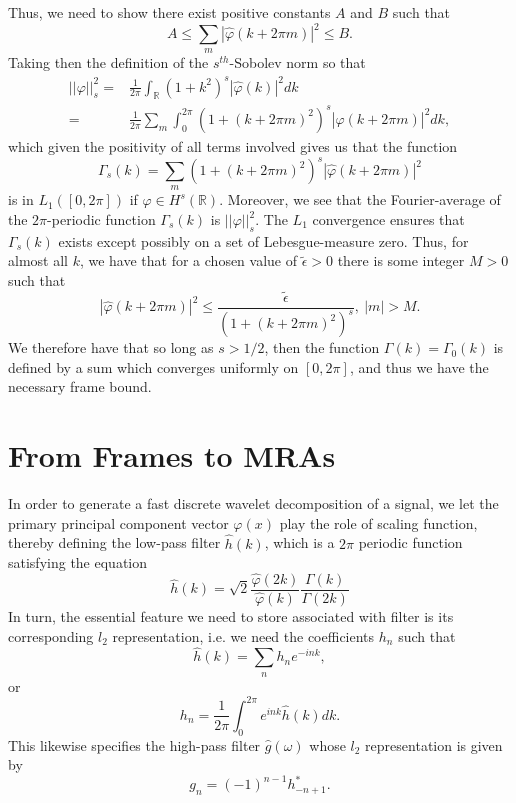 \documentclass[a4paper,11pt]{article}
\newcommand{\gnorm}[1]{\left|\left| #1\right|\right|}
\begin{document}
Thus, we need to show there exist positive constants $A$ and $B$ such that 
\[
A \leq \sum_{m} \left|\hat{\varphi}(k + 2\pi m) \right|^{2} \leq B. 
\]
Taking then the definition of the $s^{th}$-Sobolev norm so that 
\begin{align*}
\gnorm{\varphi}^{2}_{s} = & \frac{1}{2\pi}\int_{\mathbb{R}}\left(1+k^{2}\right)^{s}\left|\hat{\varphi}(k)\right|^{2}dk\\
= & \frac{1}{2\pi}\sum_{m}\int_{0}^{2\pi} \left(1 + (k+2\pi m)^{2} \right)^{s}\left|\hat{\varphi}(k+2\pi m) \right|^{2}dk,
\end{align*}
which given the positivity of all terms involved gives us that the function 
\[
\Gamma_{s}(k) = \sum_{m}\left(1 + (k+2\pi m)^{2} \right)^{s}\left|\hat{\varphi}(k+2\pi m) \right|^{2}
\]
is in $L_{1}([0,2\pi])$ if $\varphi \in H^{s}(\mathbb{R})$.  Moreover, we see that the Fourier-average of the $2\pi$-periodic function $\Gamma_{s}(k)$ is $\gnorm{\varphi}_{s}^{2}$.   The $L_{1}$ convergence ensures that $\Gamma_{s}(k)$ exists except possibly on a set of Lebesgue-measure zero.  Thus, for almost all $k$, we have that for a chosen value of $\tilde{\epsilon}>0$ there is some integer $M>0$ such that 
\[
\left|\hat{\varphi}(k+2\pi m) \right|^{2} \leq \frac{\tilde{\epsilon}}{\left(1+(k+2\pi m)^{2}\right)^{s}}, ~ |m|>M.
\]
We therefore have that so long as $s>1/2$, then the function $\Gamma(k) = \Gamma_{0}(k)$ is defined by a sum which converges uniformly on $[0,2\pi]$, and thus we have the necessary frame bound.  

\section*{From Frames to MRAs}
In order to generate a fast discrete wavelet decomposition of a signal, we let the primary principal component vector $\varphi(x)$ play the role of scaling function, thereby defining the low-pass filter $\hat{h}(k)$, which is a $2\pi$ periodic function satisfying the equation 
\[
\hat{h}(k) = \sqrt{2}\frac{\hat{\varphi}(2k)}{\hat{\varphi}(k)}\frac{\Gamma(k)}{\Gamma(2k)}
\]
In turn, the essential feature we need to store associated with filter is its corresponding $l_{2}$ representation, i.e. we need the coefficients $h_{n}$ such that 
\[
\hat{h}(k) = \sum_{n} h_{n} e^{-ink},
\]
or
\[
h_{n} = \frac{1}{2\pi}\int_{0}^{2\pi}e^{ink}\hat{h}(k)dk.
\]
This likewise specifies the high-pass filter $\hat{g}(\omega)$ whose $l_{2}$ representation is given by 
\[
g_{n} = (-1)^{n-1}h^{\ast}_{-n+1}.
\]
\end{document}
